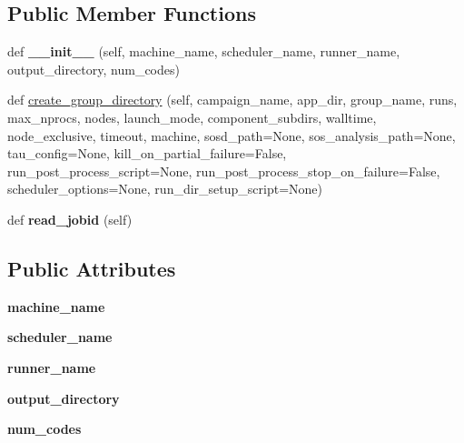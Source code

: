\subsection*{Public Member Functions}
\begin{DoxyCompactItemize}
\item 
\mbox{\label{classcodar_1_1cheetah_1_1launchers_1_1_launcher_a646b70e47e85def77f4ba1dbfbeb5b34}} 
def {\bfseries \+\_\+\+\_\+init\+\_\+\+\_\+} (self, machine\+\_\+name, scheduler\+\_\+name, runner\+\_\+name, output\+\_\+directory, num\+\_\+codes)
\item 
def \hyperlink{classcodar_1_1cheetah_1_1launchers_1_1_launcher_a961dc12bab6b346c28372995b9873e46}{create\+\_\+group\+\_\+directory} (self, campaign\+\_\+name, app\+\_\+dir, group\+\_\+name, runs, max\+\_\+nprocs, nodes, launch\+\_\+mode, component\+\_\+subdirs, walltime, node\+\_\+exclusive, timeout, machine, sosd\+\_\+path=None, sos\+\_\+analysis\+\_\+path=None, tau\+\_\+config=None, kill\+\_\+on\+\_\+partial\+\_\+failure=False, run\+\_\+post\+\_\+process\+\_\+script=None, run\+\_\+post\+\_\+process\+\_\+stop\+\_\+on\+\_\+failure=False, scheduler\+\_\+options=None, run\+\_\+dir\+\_\+setup\+\_\+script=None)
\item 
\mbox{\label{classcodar_1_1cheetah_1_1launchers_1_1_launcher_af6f838444c55859d67a1ad60fed1198e}} 
def {\bfseries read\+\_\+jobid} (self)
\end{DoxyCompactItemize}
\subsection*{Public Attributes}
\begin{DoxyCompactItemize}
\item 
\mbox{\label{classcodar_1_1cheetah_1_1launchers_1_1_launcher_a86b1aeb4e2269748abe1a8bed98202f6}} 
{\bfseries machine\+\_\+name}
\item 
\mbox{\label{classcodar_1_1cheetah_1_1launchers_1_1_launcher_aded443c0ede567093c5104eb325b87bc}} 
{\bfseries scheduler\+\_\+name}
\item 
\mbox{\label{classcodar_1_1cheetah_1_1launchers_1_1_launcher_a70843b9eef7ddfd447dd31344a8ac416}} 
{\bfseries runner\+\_\+name}
\item 
\mbox{\label{classcodar_1_1cheetah_1_1launchers_1_1_launcher_a670353f0a0273fde7c77e298850210dc}} 
{\bfseries output\+\_\+directory}
\item 
\mbox{\label{classcodar_1_1cheetah_1_1launchers_1_1_launcher_a1e3bb2f0be7b5093daf6a6391d386a09}} 
{\bfseries num\+\_\+codes}
\end{DoxyCompactItemize}
